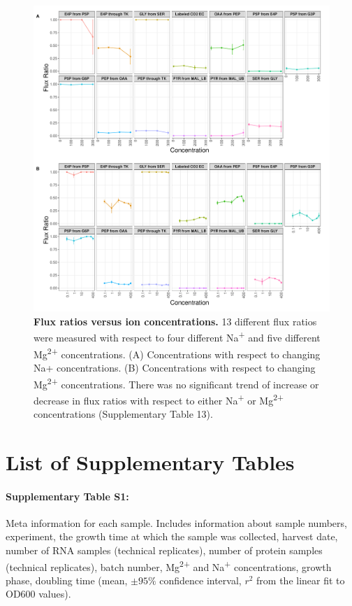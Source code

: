 \documentclass[a4paper]{article}
\begin{document}
\clearpage
\begin{figure}[!htb]
	\includegraphics[width=1\textwidth]{../../e_figures/Exp.pdf}
	\caption[Flux ratios versus ion concentrations]
	{\textbf{Flux ratios versus ion concentrations.} 13 different flux ratios were measured with respect to four different Na\textsuperscript{+} and five different Mg\textsuperscript{2+} concentrations. (A) Concentrations with respect to changing Na+ concentrations. (B) Concentrations with respect to changing Mg\textsuperscript{2+} concentrations. There was no significant trend of increase or decrease in flux ratios with respect to either Na\textsuperscript{+} or Mg\textsuperscript{2+} concentrations (Supplementary Table 13).}
\end{figure}




\clearpage

\section*{List of Supplementary Tables}

\paragraph*{Supplementary Table S1:} 
Meta information for each sample. Includes information about sample numbers, experiment, the growth time at which the sample was collected, harvest date, number of RNA samples (technical replicates), number of protein samples (technical replicates), batch number, Mg\textsuperscript{2+} and Na\textsuperscript{+} concentrations, growth phase, doubling time (mean, $\pm95\%$ confidence interval, $r^2$ from the linear fit to OD600 values).\\
\end{document}
